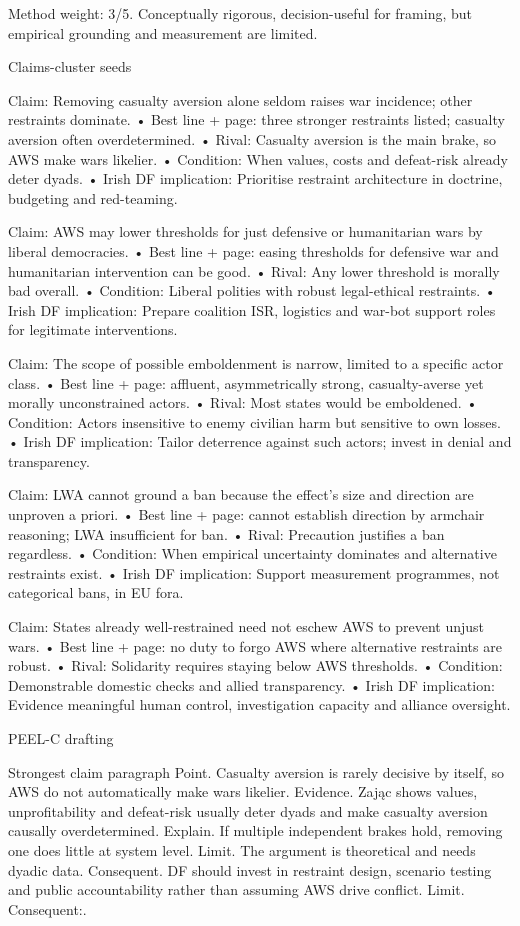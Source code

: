 Method weight: 3/5. Conceptually rigorous, decision-useful for framing, but empirical grounding and measurement are limited.

Claims-cluster seeds

Claim: Removing casualty aversion alone seldom raises war incidence; other restraints dominate.
• Best line + page: three stronger restraints listed; casualty aversion often overdetermined.
• Rival: Casualty aversion is the main brake, so AWS make wars likelier.
• Condition: When values, costs and defeat-risk already deter dyads.
• Irish DF implication: Prioritise restraint architecture in doctrine, budgeting and red-teaming.

Claim: AWS may lower thresholds for just defensive or humanitarian wars by liberal democracies.
• Best line + page: easing thresholds for defensive war and humanitarian intervention can be good.
• Rival: Any lower threshold is morally bad overall.
• Condition: Liberal polities with robust legal-ethical restraints.
• Irish DF implication: Prepare coalition ISR, logistics and war-bot support roles for legitimate interventions.

Claim: The scope of possible emboldenment is narrow, limited to a specific actor class.
• Best line + page: affluent, asymmetrically strong, casualty-averse yet morally unconstrained actors.
• Rival: Most states would be emboldened.
• Condition: Actors insensitive to enemy civilian harm but sensitive to own losses.
• Irish DF implication: Tailor deterrence against such actors; invest in denial and transparency.

Claim: LWA cannot ground a ban because the effect’s size and direction are unproven a priori.
• Best line + page: cannot establish direction by armchair reasoning; LWA insufficient for ban.
• Rival: Precaution justifies a ban regardless.
• Condition: When empirical uncertainty dominates and alternative restraints exist.
• Irish DF implication: Support measurement programmes, not categorical bans, in EU fora.

Claim: States already well-restrained need not eschew AWS to prevent unjust wars.
• Best line + page: no duty to forgo AWS where alternative restraints are robust.
• Rival: Solidarity requires staying below AWS thresholds.
• Condition: Demonstrable domestic checks and allied transparency.
• Irish DF implication: Evidence meaningful human control, investigation capacity and alliance oversight.

PEEL-C drafting

Strongest claim paragraph
Point. Casualty aversion is rarely decisive by itself, so AWS do not automatically make wars likelier.
Evidence. Zając shows values, unprofitability and defeat-risk usually deter dyads and make casualty aversion causally overdetermined.
Explain. If multiple independent brakes hold, removing one does little at system level.
Limit. The argument is theoretical and needs dyadic data.
Consequent. DF should invest in restraint design, scenario testing and public accountability rather than assuming AWS drive conflict. Limit. Consequent:.

